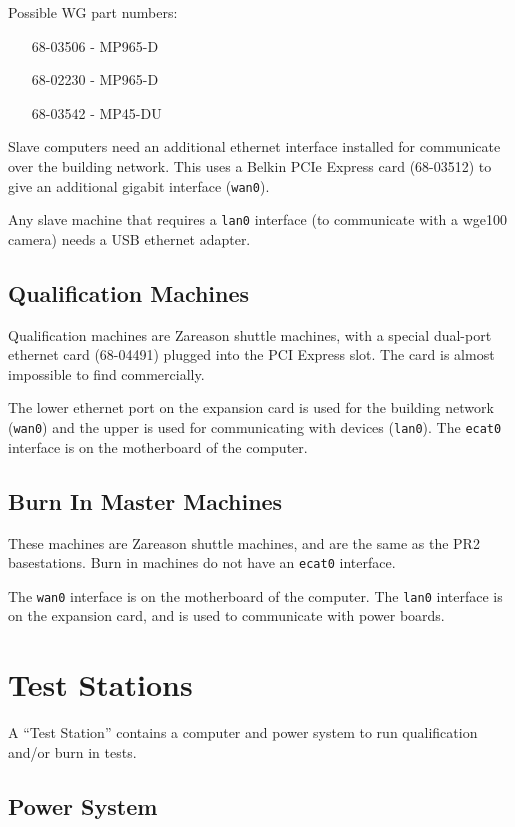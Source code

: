 \documentclass[11pt]{report}
\begin{document}
Possible WG part numbers:
\begin{itemize}
\item [68-03506] - MP965-D
\item [68-02230] - MP965-D
\item [68-03542] - MP45-DU
\end{itemize}

Slave computers need an additional ethernet interface installed for communicate over the building network. This uses a Belkin PCIe Express card (68-03512) to give an additional gigabit interface (\texttt{wan0}).

Any slave machine that requires a \texttt{lan0} interface (to communicate with a wge100 camera) needs a USB ethernet adapter. 

\subsection{Qualification Machines}

Qualification machines are Zareason shuttle machines, with a special dual-port ethernet card (68-04491) plugged into the PCI Express slot. The card is almost impossible to find commercially.

The lower ethernet port on the expansion card is used for the building network (\texttt{wan0}) and the upper is used for communicating with devices (\texttt{lan0}). The \texttt{ecat0} interface is on the motherboard of the computer.

\subsection{Burn In Master Machines}

These machines are Zareason shuttle machines, and are the same as the PR2 basestations. Burn in machines do not have an \texttt{ecat0} interface.

The \texttt{wan0} interface is on the motherboard of the computer. The \texttt{lan0} interface is on the expansion card, and is used to communicate with power boards.

\section{Test Stations}

A ``Test Station'' contains a computer and power system to run qualification and/or burn in tests.

\subsection{Power System}
\end{document}
